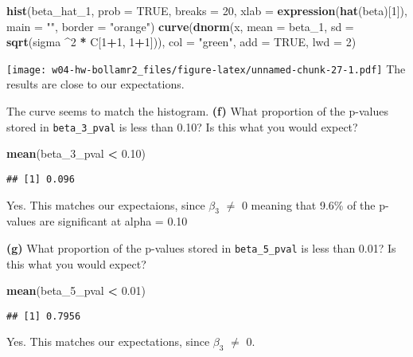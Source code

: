 \documentclass[
]{article}
\newenvironment{Shaded}{\begin{snugshade}}{\end{snugshade}}
\newcommand{\DataTypeTok}[1]{\textcolor[rgb]{0.13,0.29,0.53}{#1}}
\newcommand{\DecValTok}[1]{\textcolor[rgb]{0.00,0.00,0.81}{#1}}
\newcommand{\FloatTok}[1]{\textcolor[rgb]{0.00,0.00,0.81}{#1}}
\newcommand{\KeywordTok}[1]{\textcolor[rgb]{0.13,0.29,0.53}{\textbf{#1}}}
\newcommand{\NormalTok}[1]{#1}
\newcommand{\OperatorTok}[1]{\textcolor[rgb]{0.81,0.36,0.00}{\textbf{#1}}}
\newcommand{\OtherTok}[1]{\textcolor[rgb]{0.56,0.35,0.01}{#1}}
\newcommand{\StringTok}[1]{\textcolor[rgb]{0.31,0.60,0.02}{#1}}
\begin{document}
\begin{Shaded}
\begin{Highlighting}[]
\KeywordTok{hist}\NormalTok{(beta_hat_}\DecValTok{1}\NormalTok{, }\DataTypeTok{prob =} \OtherTok{TRUE}\NormalTok{, }\DataTypeTok{breaks =} \DecValTok{20}\NormalTok{, }\DataTypeTok{xlab =} \KeywordTok{expression}\NormalTok{(}\KeywordTok{hat}\NormalTok{(beta)[}\DecValTok{1}\NormalTok{]), }\DataTypeTok{main =} \StringTok{""}\NormalTok{, }\DataTypeTok{border =} \StringTok{"orange"}\NormalTok{)}
\KeywordTok{curve}\NormalTok{(}\KeywordTok{dnorm}\NormalTok{(x, }\DataTypeTok{mean =}\NormalTok{ beta_}\DecValTok{1}\NormalTok{, }\DataTypeTok{sd =} \KeywordTok{sqrt}\NormalTok{(sigma }\OperatorTok{^}\DecValTok{2} \OperatorTok{*}\StringTok{ }\NormalTok{C[}\DecValTok{1}\OperatorTok{+}\DecValTok{1}\NormalTok{, }\DecValTok{1}\OperatorTok{+}\DecValTok{1}\NormalTok{])), }\DataTypeTok{col =} \StringTok{"green"}\NormalTok{, }\DataTypeTok{add =} \OtherTok{TRUE}\NormalTok{, }\DataTypeTok{lwd =} \DecValTok{2}\NormalTok{)}
\end{Highlighting}
\end{Shaded}

\texttt{[image: w04-hw-bollamr2\_files/figure-latex/unnamed-chunk-27-1.pdf]}
The results are close to our expectations.

The curve seems to match the histogram. \textbf{(f)} What proportion of
the p-values stored in \texttt{beta\_3\_pval} is less than 0.10? Is this
what you would expect?

\begin{Shaded}
\begin{Highlighting}[]
\KeywordTok{mean}\NormalTok{(beta_}\DecValTok{3}\NormalTok{_pval }\OperatorTok{<}\StringTok{ }\FloatTok{0.10}\NormalTok{)}
\end{Highlighting}
\end{Shaded}

\begin{verbatim}
## [1] 0.096
\end{verbatim}

Yes. This matches our expectaions, since \(\beta_3\) \(\neq\) 0 meaning
that 9.6\% of the p-values are significant at alpha = 0.10

\textbf{(g)} What proportion of the p-values stored in
\texttt{beta\_5\_pval} is less than 0.01? Is this what you would expect?

\begin{Shaded}
\begin{Highlighting}[]
\KeywordTok{mean}\NormalTok{(beta_}\DecValTok{5}\NormalTok{_pval }\OperatorTok{<}\StringTok{ }\FloatTok{0.01}\NormalTok{)}
\end{Highlighting}
\end{Shaded}

\begin{verbatim}
## [1] 0.7956
\end{verbatim}

Yes. This matches our expectations, since \(\beta_3\) \(\neq\) 0.
\end{document}
